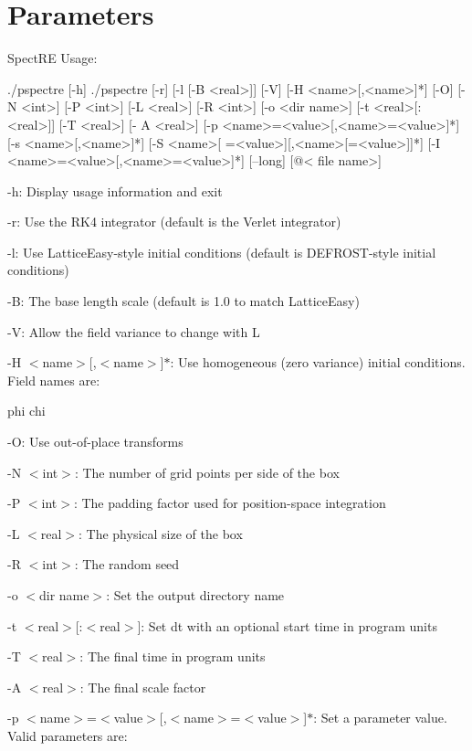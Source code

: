 \hypertarget{running_Command-Line}{}\section{Parameters}\label{running_Command-Line}
SpectRE Usage: 
\begin{DoxyCode}
 ./pspectre [-h]
 ./pspectre [-r] [-l [-B <real>]] [-V] [-H <name>[,<name>]*] [-O] [-N <int>] [-P 
      <int>] [-L <real>] [-R <int>] [-o <dir name>] [-t <real>[:<real>]] [-T <real>] [-
      A <real>] [-p <name>=<value>[,<name>=<value>]*] [-s <name>[,<name>]*] [-S <name>[
      =<value>][,<name>[=<value>]]*] [-I <name>=<value>[,<name>=<value>]*] [--long] [@<
      file name>]
\end{DoxyCode}


\begin{DoxyItemize}
\item -\/h: Display usage information and exit \item -\/r: Use the RK4 integrator (default is the Verlet integrator) \item -\/l: Use LatticeEasy-\/style initial conditions (default is DEFROST-\/style initial conditions) \item -\/B: The base length scale (default is 1.0 to match LatticeEasy) \item -\/V: Allow the field variance to change with L \item -\/H $<$name$>$\mbox{[},$<$name$>$\mbox{]}$\ast$: Use homogeneous (zero variance) initial conditions. Field names are: 
\begin{DoxyCode}
      phi
      chi
\end{DoxyCode}
 \item -\/O: Use out-\/of-\/place transforms \item -\/N $<$int$>$: The number of grid points per side of the box \item -\/P $<$int$>$: The padding factor used for position-\/space integration \item -\/L $<$real$>$: The physical size of the box \item -\/R $<$int$>$: The random seed \item -\/o $<$dir name$>$: Set the output directory name \item -\/t $<$real$>$\mbox{[}:$<$real$>$\mbox{]}: Set dt with an optional start time in program units \item -\/T $<$real$>$: The final time in program units \item -\/A $<$real$>$: The final scale factor \item -\/p $<$name$>$=$<$value$>$\mbox{[},$<$name$>$=$<$value$>$\mbox{]}$\ast$: Set a parameter value. Valid parameters are: 

\end{DoxyItemize}
